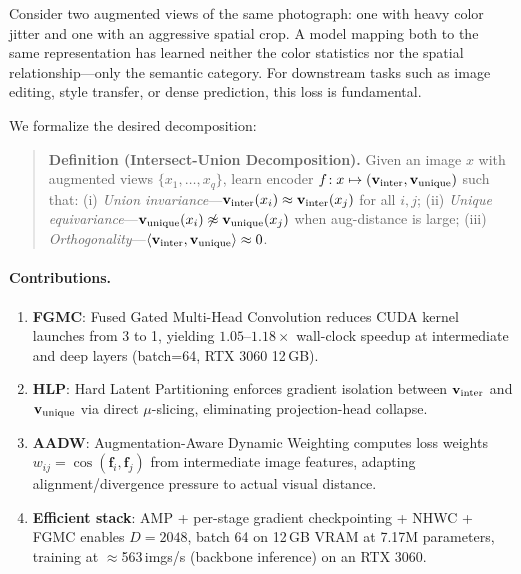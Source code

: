 \documentclass[10pt,twocolumn]{article}
\begin{document}
Consider two augmented views of the same photograph: one with heavy color jitter
and one with an aggressive spatial crop. A model mapping both to the same
representation has learned neither the color statistics nor the spatial
relationship---only the semantic category. For downstream tasks such as image
editing, style transfer, or dense prediction, this loss is fundamental.

We formalize the desired decomposition:

\begin{quote}
\textbf{Definition (Intersect-Union Decomposition).} Given an image $x$ with
augmented views $\{x_1,\ldots,x_q\}$, learn encoder $f\!: x \mapsto
(\mathbf{v}_{\rm inter}, \mathbf{v}_{\rm unique})$ such that: (i) \emph{Union
invariance}---$\mathbf{v}_{\rm inter}(x_i)\approx \mathbf{v}_{\rm inter}(x_j)$
for all $i,j$; (ii) \emph{Unique equivariance}---$\mathbf{v}_{\rm unique}(x_i)
\not\approx \mathbf{v}_{\rm unique}(x_j)$ when aug-distance is large; (iii)
\emph{Orthogonality}---$\langle \mathbf{v}_{\rm inter}, \mathbf{v}_{\rm unique}
\rangle \approx 0$.
\end{quote}

\paragraph{Contributions.}
\begin{enumerate}[leftmargin=*, nosep]
\item \textbf{FGMC}: Fused Gated Multi-Head Convolution reduces CUDA kernel
launches from 3 to 1, yielding $1.05$--$1.18\times$ wall-clock speedup at
intermediate and deep layers (batch=64, RTX 3060 12\,GB).
\item \textbf{HLP}: Hard Latent Partitioning enforces gradient isolation between
$\mathbf{v}_{\rm inter}$ and $\mathbf{v}_{\rm unique}$ via direct $\mu$-slicing,
eliminating projection-head collapse.
\item \textbf{AADW}: Augmentation-Aware Dynamic Weighting computes loss weights
$w_{ij}{=}\cos(\mathbf{f}_i, \mathbf{f}_j)$ from intermediate image features,
adapting alignment/divergence pressure to actual visual distance.
\item \textbf{Efficient stack}: AMP + per-stage gradient checkpointing + NHWC +
FGMC enables $D{=}2048$, batch 64 on 12\,GB VRAM at 7.17M parameters, training
at $\approx$563\,imgs/s (backbone inference) on an RTX 3060.
\end{enumerate}

\end{document}

